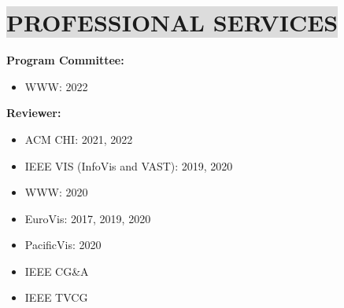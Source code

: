 \section*{
    \colorbox{gainsboro}{PROFESSIONAL SERVICES}
}
\textbf{Program Committee:}
\vspace{-3mm}
\begin{itemize}[leftmargin=5mm,noitemsep,itemsep=0pt]
    \item WWW: 2022
\end{itemize}

\textbf{Reviewer:}
\vspace{-3mm}
\begin{itemize}[leftmargin=5mm,noitemsep,itemsep=0pt]
    \item ACM CHI: 2021, 2022
    \item IEEE VIS (InfoVis and VAST): 2019, 2020
    \item WWW: 2020
    \item EuroVis: 2017, 2019, 2020
    \item PacificVis: 2020
    \item IEEE CG\&A
    \item IEEE TVCG
\end{itemize}

